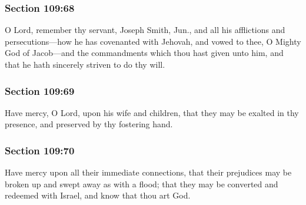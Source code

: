 	\subsubsection{Section 109:68} %
		\label{DC109-68}

		O Lord, remember thy servant, Joseph Smith, Jun., and all his afflictions and persecutions---how he has covenanted with Jehovah, and vowed to thee, O Mighty God of Jacob---and the commandments which thou hast given unto him, and that he hath sincerely striven to do thy will.


	\subsubsection{Section 109:69} %
		\label{DC109-69}

		Have mercy, O Lord, upon his wife and children, that they may be exalted in thy presence, and preserved by thy fostering hand.


	\subsubsection{Section 109:70} %
		\label{DC109-70}

		Have mercy upon all their immediate connections, that their prejudices may be broken up and swept away as with a flood; that they may be converted and redeemed with Israel, and know that thou art God.



